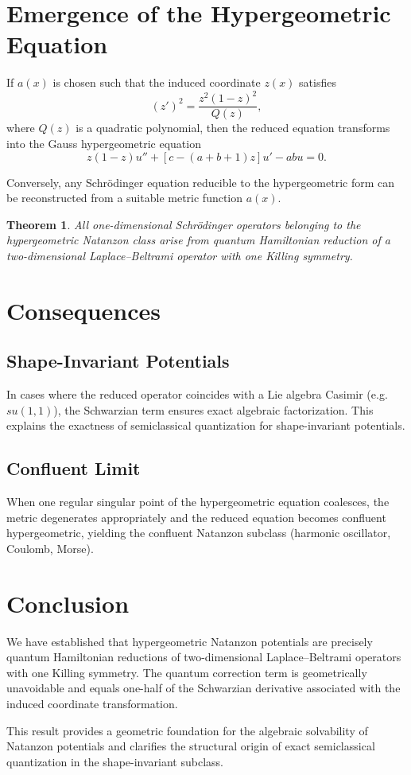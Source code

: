 \documentclass[11pt]{article}
\newtheorem{theorem}{Theorem}
\begin{document}
\section{Emergence of the Hypergeometric Equation}

If $a(x)$ is chosen such that the induced coordinate $z(x)$ satisfies
\begin{equation}
(z')^2 = \frac{z^2(1-z)^2}{Q(z)},
\end{equation}
where $Q(z)$ is a quadratic polynomial, then the reduced equation transforms into the Gauss hypergeometric equation
\begin{equation}
z(1-z)u''+[c-(a+b+1)z]u'-ab u=0.
\end{equation}

Conversely, any Schr\"odinger equation reducible to the hypergeometric form can be reconstructed from a suitable metric function $a(x)$.

\begin{theorem}
All one-dimensional Schr\"odinger operators belonging to the hypergeometric Natanzon class arise from quantum Hamiltonian reduction of a two-dimensional Laplace--Beltrami operator with one Killing symmetry.
\end{theorem}

\section{Consequences}

\subsection{Shape-Invariant Potentials}

In cases where the reduced operator coincides with a Lie algebra Casimir (e.g. $su(1,1)$), the Schwarzian term ensures exact algebraic factorization. This explains the exactness of semiclassical quantization for shape-invariant potentials.

\subsection{Confluent Limit}

When one regular singular point of the hypergeometric equation coalesces, the metric degenerates appropriately and the reduced equation becomes confluent hypergeometric, yielding the confluent Natanzon subclass (harmonic oscillator, Coulomb, Morse).

\section{Conclusion}

We have established that hypergeometric Natanzon potentials are precisely quantum Hamiltonian reductions of two-dimensional Laplace--Beltrami operators with one Killing symmetry. The quantum correction term is geometrically unavoidable and equals one-half of the Schwarzian derivative associated with the induced coordinate transformation.

This result provides a geometric foundation for the algebraic solvability of Natanzon potentials and clarifies the structural origin of exact semiclassical quantization in the shape-invariant subclass.
\end{document}
